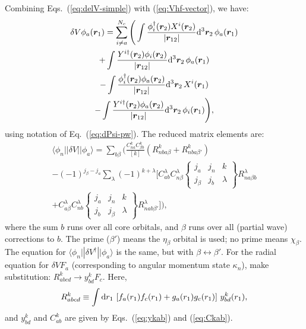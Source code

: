 \documentclass[10pt,twocolumn,a4paper]{article}%
\newcommand{\bra}[1]{\ensuremath{\langle #1|}}	%
\newcommand{\ket}[1]{\ensuremath{|#1\rangle}}	%
\newcommand{\sixj}[6]{\ensuremath{\begin{Bmatrix}#1&#2&#3\\#4&#5&#6\end{Bmatrix}}}	%
\renewcommand{\v}[1]{\ensuremath{\boldsymbol{#1}}}		%
\newcommand{\be}{\begin{equation}}
\newcommand{\ee}{\end{equation}}
\def\d{\ensuremath{{\rm d}}}
\renewcommand{\b}{\ensuremath{\beta}}
\begin{document}




Combining Eqs.~(\ref{eq:delV-simple}) with (\ref{eq:Vhf-vector}), we have:
\begin{multline}\label{eq:del-Vhf-vector}
\delta V\phi_a(\v{r}_1) = \sum_{i\neq a}^{N_c}\Bigg(
\int \frac{\phi_i^\dag(\v{r}_2)X^i(\v{r}_2)}{|\v{r}_{12}|}\d^3\v{r}_2\,\phi_a(\v{r}_1)\\
+\int \frac{Y^{i\dag}(\v{r}_2)\phi_i(\v{r}_2)}{|\v{r}_{12}|}\d^3\v{r}_2\,\phi_a(\v{r}_1)\\
-\int \frac{\phi_i^\dag(\v{r}_2)\phi_a(\v{r}_2)}{|\v{r}_{12}|}\d^3\v{r}_2\,X^i(\v{r}_1)\\
-\int \frac{Y^{i\dag}(\v{r}_2)\phi_a(\v{r}_2)}{|\v{r}_{12}|}\d^3\v{r}_2\,\phi_i(\v{r}_1)
\Bigg),
\end{multline}
using notation of Eq.~(\ref{eq:dPsi-pw}).
%
The reduced matrix elements are:
\begin{multline}\label{eq:dV-rme}
\bra{\phi_n}|\delta V|\ket{\phi_a}
 =
 \sum_{b\beta}\Bigg(
\frac{C^k_{na}C^k_{\b b}}{[k]}
(R^k_{nba\b} + R^k_{nba\b'})
\\
-(-1)^{j_\b-j_a}\sum_\lambda(-1)^{k+\lambda}
\Bigg[
C^\lambda_{ab}C^\lambda_{n \beta}\sixj{j_a}{j_n}{k}{j_\beta}{j_b}{\lambda}R^\lambda_{na\b b}
\\
+C^\lambda_{a \beta}C^\lambda_{n b}\sixj{j_a}{j_n}{k}{j_b}{j_\beta}{\lambda}R^\lambda_{nab\b'}
\Bigg]
\Bigg),
\end{multline}
where the sum $b$ runs over all core orbitals, and $\beta$ runs over all (partial wave) corrections to $b$.
The prime ($\beta'$) means the $\eta_\beta$ orbital is used; no prime means $\chi_\beta$.
The equation for $\bra{\phi_n}|\delta V^\dag|\ket{\phi_a}$ is the same, but with $\beta\leftrightarrow\beta'$.
For the radial equation for $\delta V F_a$ (corresponding to angular momentum state $\kappa_n$), make substitution:
$R^k_{abcd}\to y^k_{bd}F_c$.
%
Here,
\be\label{eq:Rkabcd}
R^k_{abcd} \equiv \int\d r_1 \, \left[f_a(r_1)f_c(r_1) + g_a(r_1)g_c(r_1)\right]\, y^k_{bd}(r_1),
\ee
and $y^k_{bd}$ and $C^k_{ab}$ are given by Eqs.~(\ref{eq:ykab}) and (\ref{eq:Ckab}).
\end{document}
